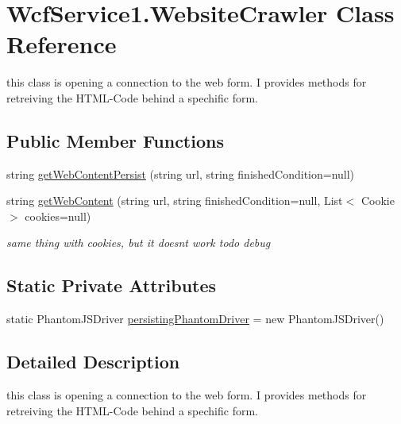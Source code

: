 \hypertarget{class_wcf_service1_1_1_website_crawler}{}\section{Wcf\+Service1.\+Website\+Crawler Class Reference}
\label{class_wcf_service1_1_1_website_crawler}


this class is opening a connection to the web form. I provides methods for retreiving the H\+T\+M\+L-\/\+Code behind a spechific form.  


\subsection*{Public Member Functions}
\begin{DoxyCompactItemize}
\item 
string \hyperlink{class_wcf_service1_1_1_website_crawler_afb8f0be0431c8622a8071d8ee088601e}{get\+Web\+Content\+Persist} (string url, string finished\+Condition=null)
\item 
string \hyperlink{class_wcf_service1_1_1_website_crawler_a53d529051737c346206af942b7c06763}{get\+Web\+Content} (string url, string finished\+Condition=null, List$<$ Cookie $>$ cookies=null)
\begin{DoxyCompactList}\small\item\em same thing with cookies, but it doesn\textquotesingle{}t work todo debug \end{DoxyCompactList}\end{DoxyCompactItemize}
\subsection*{Static Private Attributes}
\begin{DoxyCompactItemize}
\item 
static Phantom\+J\+S\+Driver \hyperlink{class_wcf_service1_1_1_website_crawler_a19b2a7a21595cee4f8a9317add3bc0b0}{persisting\+Phantom\+Driver} = new Phantom\+J\+S\+Driver()
\end{DoxyCompactItemize}


\subsection{Detailed Description}
this class is opening a connection to the web form. I provides methods for retreiving the H\+T\+M\+L-\/\+Code behind a spechific form. 



